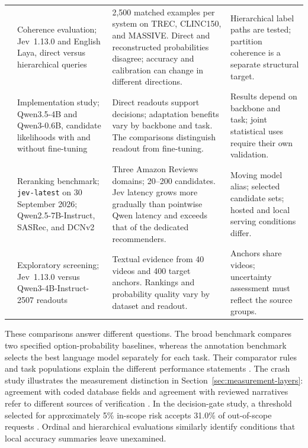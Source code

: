 \documentclass[11pt,a4paper]{article}
\begin{document}
\begin{longtable}{@{}L{2.2cm}L{3.5cm}L{5.0cm}L{3.7cm}@{}}
\addlinespace
\citet{joy2026} & Coherence evaluation; Jev~1.13.0 and English Laya, direct versus hierarchical queries & 2,500 matched examples per system on TREC, CLINC150, and MASSIVE. Direct and reconstructed probabilities disagree; accuracy and calibration can change in different directions. & Hierarchical label paths are tested; partition coherence is a separate structural target. \\
\addlinespace
\citet{liwagle2026} & Implementation study; Qwen3.5-4B and Qwen3-0.6B, candidate likelihoods with and without fine-tuning & Direct readouts support decisions; adaptation benefits vary by backbone and task. The comparisons distinguish readout from fine-tuning. & Results depend on backbone and task; joint statistical uses require their own validation. \\
\addlinespace
\citet{lyu2026} & Reranking benchmark; \texttt{jev-latest} on 30 September 2026; Qwen2.5-7B-Instruct, SASRec, and DCNv2 & Three Amazon Reviews domains; 20--200 candidates. Jev latency grows more gradually than pointwise Qwen latency and exceeds that of the dedicated recommenders. & Moving model alias; selected candidate sets; hosted and local serving conditions differ. \\
\addlinespace
\citet{qin2026} & Exploratory screening; Jev~1.13.0 versus Qwen3-4B-Instruct-2507 readouts & Textual evidence from 40 videos and 400 target anchors. Rankings and probability quality vary by dataset and readout. & Anchors share videos; uncertainty assessment must reflect the source groups. \\
\end{longtable}
\endgroup

These comparisons answer different questions. The broad benchmark compares two specified option-probability baselines, whereas the annotation benchmark selects the best language model separately for each task. Their comparator rules and task populations explain the different performance statements \citep{deusser2026,ibrahim2026}. The crash study illustrates the measurement distinction in Section~\ref{sec:measurement-layers}: agreement with coded database fields and agreement with reviewed narratives refer to different sources of verification \citep{crash2026}. In the decision-gate study, a threshold selected for approximately 5\% in-scope risk accepts 31.0\% of out-of-scope requests \citep{rafe2026}. Ordinal and hierarchical evaluations similarly identify conditions that local accuracy summaries leave unexamined.
\end{document}
